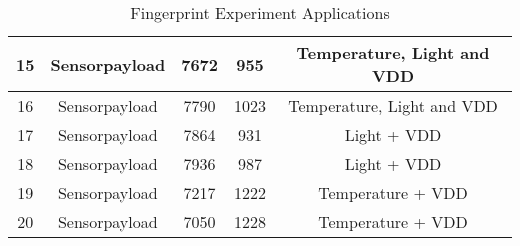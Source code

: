 \begin{table}[!ht]
\begin{tabular}{|c|c|c|c|c|}
15                   & Sensorpayload        & 7672          & 955                    & Temperature, Light and VDD \\ \hline
16                   & Sensorpayload        & 7790          & 1023                   & Temperature, Light and VDD \\ \hline
17                   & Sensorpayload        & 7864          & 931                    & Light + VDD                \\ \hline
18                   & Sensorpayload        & 7936          & 987                    & Light + VDD                \\ \hline
19                   & Sensorpayload        & 7217          & 1222                   & Temperature + VDD          \\ \hline
20                   & Sensorpayload        & 7050          & 1228                   & Temperature + VDD          \\ \hline
\end{tabular}
\caption{Fingerprint Experiment Applications}
\label{FingerprintApps}
\end{table}
